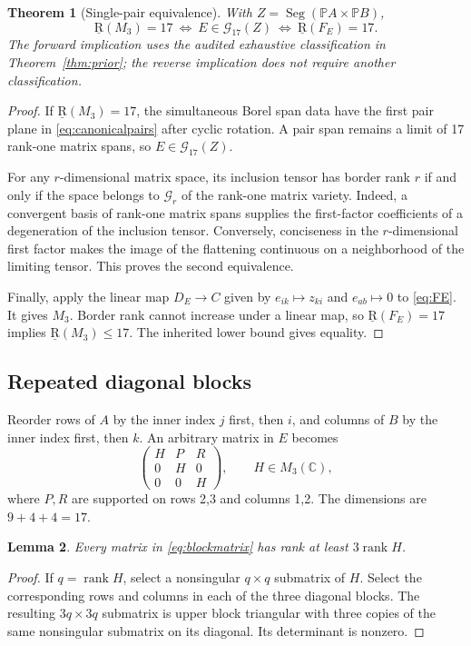 \documentclass[11pt]{article}
\newtheorem{theorem}{Theorem}[section]
\newtheorem{lemma}[theorem]{Lemma}
\theoremstyle{definition}\newtheorem{definition}[theorem]{Definition}
\theoremstyle{remark}\newtheorem{remark}[theorem]{Remark}
\newcommand{\C}{\mathbb C}
\newcommand{\PP}{\mathbb P}
\newcommand{\br}{\underline{\mathrm R}}
\newcommand{\Seg}{\operatorname{Seg}}
\newcommand{\rank}{\operatorname{rank}}
\newcommand{\calG}{\mathcal G}
\begin{document}
\begin{theorem}[Single-pair equivalence]\label{thm:pair}
With $Z=\Seg(\PP A\times\PP B)$,
\[
\boxed{\br(M_3)=17\ \Longleftrightarrow\ E\in\calG_{17}(Z)
                   \ \Longleftrightarrow\ \br(F_E)=17.}
\]
The forward implication uses the audited exhaustive classification in
Theorem~\ref{thm:prior}; the reverse implication does not require another
classification.
\end{theorem}
\begin{proof}
If $\br(M_3)=17$, the simultaneous Borel span data have the first pair plane in
\eqref{eq:canonicalpairs} after cyclic rotation. A pair span remains a limit of
17 rank-one matrix spans, so $E\in\calG_{17}(Z)$.

For any $r$-dimensional matrix space, its inclusion tensor has border rank $r$
if and only if the space belongs to $\calG_r$ of the rank-one matrix variety.
Indeed, a convergent basis of rank-one matrix spans supplies the first-factor
coefficients of a degeneration of the inclusion tensor. Conversely, conciseness
in the $r$-dimensional first factor makes the image of the flattening continuous
on a neighborhood of the limiting tensor. This proves the second equivalence.

Finally, apply the linear map $D_E\to C$ given by $e_{ik}\mapsto z_{ki}$ and
$e_{ab}\mapsto0$ to \eqref{eq:FE}. It gives $M_3$. Border rank cannot increase
under a linear map, so $\br(F_E)=17$ implies $\br(M_3)\leq17$. The inherited
lower bound gives equality.
\end{proof}

\subsection{Repeated diagonal blocks}

Reorder rows of $A$ by the inner index $j$ first, then $i$, and columns of $B$ by
the inner index first, then $k$. An arbitrary matrix in $E$ becomes
\begin{equation}\label{eq:blockmatrix}
 \begin{pmatrix}H&P&R\\0&H&0\\0&0&H\end{pmatrix},
 \qquad H\in M_3(\C),
\end{equation}
where $P,R$ are supported on rows 2,3 and columns 1,2. The dimensions are
$9+4+4=17$.

\begin{lemma}\label{lem:rank3}
Every matrix in \eqref{eq:blockmatrix} has rank at least $3\rank H$.
\end{lemma}
\begin{proof}
If $q=\rank H$, select a nonsingular $q\times q$ submatrix of $H$. Select the
corresponding rows and columns in each of the three diagonal blocks. The
resulting $3q\times3q$ submatrix is upper block triangular with three copies of
the same nonsingular submatrix on its diagonal. Its determinant is nonzero.
\end{proof}
\end{document}

